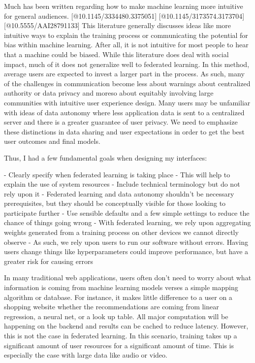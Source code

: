 \documentclass[manuscript,screen,review]{acmart}
\begin{document}
Much has been written regarding how to make machine learning more intuitive for general audiences. [@10.1145/3334480.3375051] [@10.1145/3173574.3173704] [@10.5555/AAI28791133] This literature generally discusses ideas like more intuitive ways to explain the training process or communicating the potential for bias within machine learning. After all, it is not intuitive for most people to hear that a machine could be biased. While this literature does deal with social impact, much of it does not generalize well to federated learning. In this method, average users are expected to invest a larger part in the process. As such, many of the challenges in communication become less about warnings about centralized authority or data privacy and moreso about equitably involving large communities with intuitive user experience design. Many users may be unfamiliar with ideas of data autonomy where less application data is sent to a centralized server and there is a greater guarantee of user privacy. We need to emphasize these distinctions in data sharing and user expectations in order to get the best user outcomes and final models.

Thus, I had a few fundamental goals when designing my interfaces:

- Clearly specify when federated learning is taking place
  - This will help to explain the use of system resources
- Include technical terminology but do not rely upon it
  - Federated learning and data autonomy shouldn't be necessary prerequisites, but they should be conceptually visible for those looking to participate further
- Use sensible defaults and a few simple settings to reduce the chance of things going wrong
  - With federated learning, we rely upon aggregating weights generated from a training process on other devices we cannot directly observe
  - As such, we rely upon users to run our software without errors. Having users change things like hyperparameters could improve performance, but have a greater risk for causing errors

In many traditional web applications, users often don't need to worry about what information is coming from machine learning models verses a simple mapping algorithm or database. For instance, it makes little difference to a user on a shopping website whether the recommendations are coming from linear regression, a neural net, or a look up table. All major computation will be happening on the backend and results can be cached to reduce latency. However, this is not the case in federated learning. In this scenario, training takes up a significant amount of user resources for a significant amount of time. This is especially the case with large data like audio or video.
\end{document}
